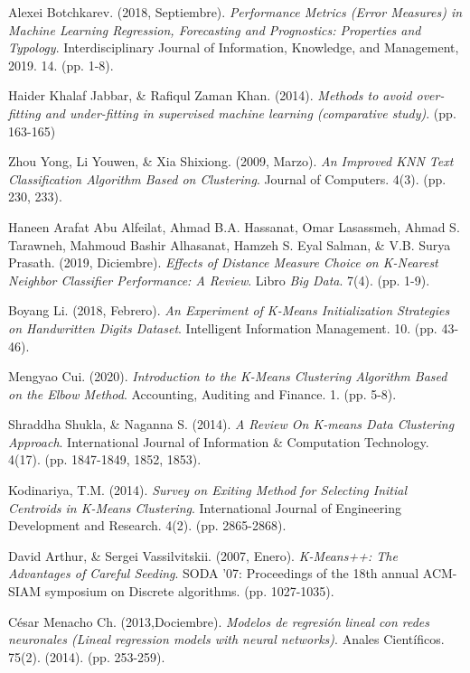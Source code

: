 \documentclass[12pt,a4paper]{article}
\begin{document}
\begin{sloppypar}
\begin{thebibliography}{9}
Alexei Botchkarev. (2018, Septiembre). \textit{Performance Metrics (Error Measures) in Machine Learning Regression, Forecasting and Prognostics: Properties and Typology}. Interdisciplinary Journal of Information, Knowledge, and Management, 2019. 14. (pp. 1-8).

Haider Khalaf Jabbar, \& Rafiqul Zaman Khan. (2014). \textit{Methods to avoid over-fitting and under-fitting in supervised machine learning (comparative study)}. (pp. 163-165)

Zhou Yong,  Li Youwen, \& Xia Shixiong. (2009, Marzo). \textit{An Improved KNN Text Classification Algorithm Based on Clustering}. Journal of Computers. 4(3). (pp. 230, 233). 

Haneen Arafat Abu Alfeilat, Ahmad B.A. Hassanat, Omar Lasassmeh, Ahmad S. Tarawneh, Mahmoud Bashir Alhasanat, Hamzeh S. Eyal Salman, \& V.B. Surya Prasath. (2019, Diciembre). \textit{Effects of Distance Measure Choice on K-Nearest Neighbor Classifier Performance: A Review}. Libro \textit{Big Data}. 7(4). (pp. 1-9).

Boyang Li. (2018, Febrero). \textit{An Experiment of K-Means Initialization Strategies on Handwritten Digits Dataset}. Intelligent Information Management. 10. (pp. 43-46). 

Mengyao Cui. (2020). \textit{Introduction to the K-Means Clustering Algorithm Based on the Elbow Method}. Accounting, Auditing and Finance. 1. (pp. 5-8).

Shraddha Shukla, \& Naganna S. (2014). \textit{A Review On K-means Data Clustering Approach}. International Journal of Information \& Computation Technology. 4(17). (pp. 1847-1849, 1852, 1853).

Kodinariya, T.M. (2014). \textit{Survey on Exiting Method for Selecting Initial Centroids in K-Means Clustering}. International Journal of Engineering Development and Research. 4(2). (pp. 2865-2868).

David Arthur, \& Sergei Vassilvitskii. (2007, Enero). \textit{K-Means++: The Advantages of Careful Seeding}. SODA '07: Proceedings of the 18th annual ACM-SIAM symposium on Discrete algorithms. (pp. 1027-1035).

César Menacho Ch. (2013,Dociembre). \textit{Modelos de regresión lineal con redes neuronales (Lineal regression models with neural networks)}. Anales Científicos. 75(2). (2014). (pp. 253-259).


\end{thebibliography}
\end{sloppypar}
\end{document}
